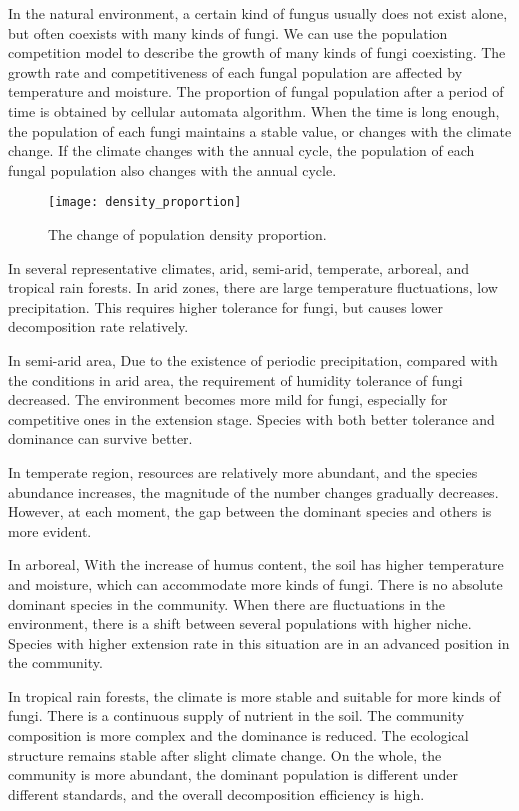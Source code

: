 \documentclass{mcmthesis}
\begin{document}
\begin{appendices}
In the natural environment, a certain kind of fungus usually does not exist alone, but often coexists with many kinds of fungi. We can use the population competition model to describe the growth of many kinds of fungi coexisting. The growth rate and competitiveness of each fungal population are affected by temperature and moisture. The proportion of fungal population after a period of time is obtained by cellular automata algorithm. When the time is long enough, the population of each fungi maintains a stable value, or changes with the climate change. If the climate changes with the annual cycle, the population of each fungal population also changes with the annual cycle.

\begin{figure}[H]
  \small
  \centering
  \texttt{[image: density\_proportion]}
  \caption{The change of population density proportion.}
  \label{density_proportion}
\end{figure}

In several representative climates, arid, semi-arid, temperate, arboreal, and tropical rain forests. In arid zones, there are large temperature fluctuations, low precipitation. This requires higher tolerance for fungi, but causes lower decomposition rate relatively. 

In semi-arid area, Due to the existence of periodic precipitation, compared with the conditions in arid area, the requirement of humidity tolerance of fungi decreased. The environment becomes more mild for fungi, especially for competitive ones in the extension stage. Species with both better tolerance and dominance can survive better.

In temperate region, resources are relatively more abundant, and the species abundance increases, the magnitude of the number changes gradually decreases. However, at each moment, the gap between the dominant species and others is more evident. 

In arboreal, With the increase of humus content, the soil has higher temperature and moisture, which can accommodate more kinds of fungi. There is no absolute dominant species in the community. When there are fluctuations in the environment, there is a shift between several populations with higher niche. Species with higher extension rate in this situation are in an advanced position in the community.

In tropical rain forests, the climate is more stable and suitable for more kinds of fungi. There is a continuous supply of nutrient in the soil. The community composition is more complex and the dominance is reduced. The ecological structure remains stable after slight climate change. On the whole, the community is more abundant, the dominant population is different under different standards, and the overall decomposition efficiency is high.


\end{appendices}
\end{document}
